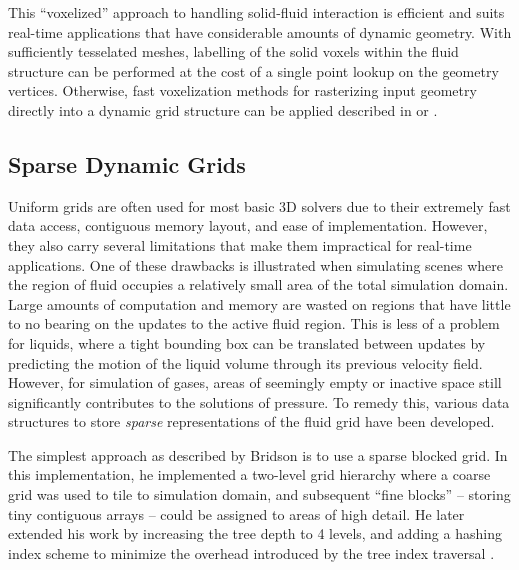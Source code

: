 \documentclass[a4paper, 11pt, titlepage]{article}
\renewcommand\i[1]{\textit{#1}}%
\begin{document}
This ``voxelized'' approach to handling solid-fluid interaction is efficient and
suits real-time applications that have considerable amounts of dynamic
geometry. With sufficiently tesselated meshes, labelling of the solid voxels
within the fluid structure can be performed at the cost of a single point
lookup on the geometry vertices. Otherwise, fast voxelization methods for
rasterizing input geometry directly into a dynamic grid structure can be applied
described in \cite{janssen2015fast} or \cite{fang2000hardware}.

 
\subsection{Sparse Dynamic Grids}
Uniform grids are often used for most basic 3D solvers due to their extremely
fast data access, contiguous memory layout, and ease of implementation. However,
they also carry several limitations that make them impractical for real-time
applications. One of these drawbacks is illustrated when simulating scenes where
the region of fluid occupies a relatively small area of the total simulation
domain. Large amounts of computation and memory are wasted on regions that have
little to no bearing on the updates to the active fluid region. This is less of
a problem for liquids, where a tight bounding box can be
translated between updates by predicting the motion of the liquid volume through
its previous velocity field. However, for simulation of gases, areas of
seemingly empty or inactive space still significantly contributes to the
solutions of pressure. To remedy this, various data structures to store
\i{sparse} representations of the fluid grid have been developed.

The simplest approach as described by Bridson is to use a sparse
blocked grid. In this implementation, he implemented a two-level grid hierarchy
where a coarse grid was used to tile to simulation domain, and subsequent ``fine
blocks'' -- storing tiny contiguous arrays -- could be assigned to areas of high
detail. He later extended his work by increasing the tree depth to 4 levels, and
adding a hashing index scheme to minimize the overhead introduced by the tree
index traversal \cite{bridson2003computational}.
\end{document}
